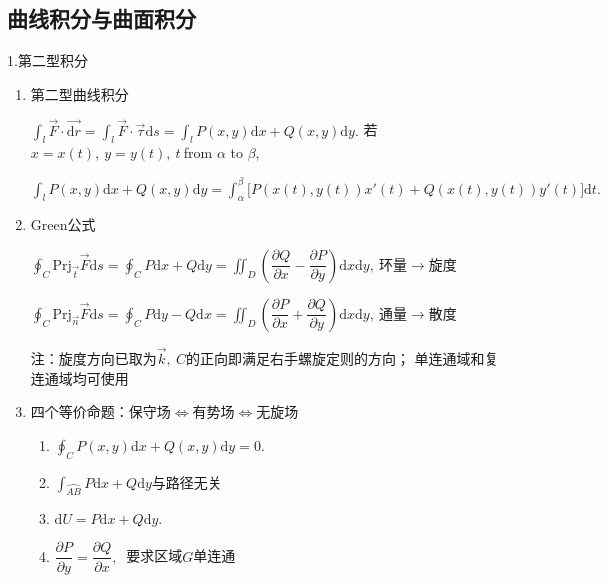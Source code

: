 \documentclass[UTF8]{ctexart}
\newcommand\dif{\mathrm{d}}
\newcommand\no{\noindent}
\newcommand\dis{\displaystyle}
\newcommand\intd{\dis\int}
\begin{document}
\begin{spacing}{2}
\subsection{曲线积分与曲面积分}

\no1.第二型积分

\begin{enumerate}[itemindent=1.4em, label=(\arabic*)]

\item 第二型曲线积分

$\intd_l\stackrel{\rightarrow}{F}\cdot \stackrel{\longrightarrow}{\dif r}=
\intd_l\stackrel{\rightarrow}{F}\cdot\stackrel{\rightarrow}{\tau}\dif s=
\intd_lP(x,y)\dif x+Q(x,y)\dif y.$
若$x=x(t),\ y=y(t),\ t \ $from $\alpha$ to $\beta$, 

$\intd_lP(x,y)\dif x+Q(x,y)\dif y
=\intd_\alpha^\beta\big[P(x(t),y(t))x'(t)+Q(x(t),y(t))y'(t)\big]\dif t.$

\item \textcolor[rgb]{1,0,0}{Green公式}

$\dis\oint_C\text{Prj}_{\stackrel{\rightarrow}{t}}\stackrel{\rightarrow}{F}\dif s
=\oint_CP\dif x+Q\dif y=
\iint_D\left(\dfrac{\partial Q}{\partial x}-\dfrac{\partial P}{\partial y}\right)\dif x\dif y,
\ $环量$\longrightarrow$旋度

$\dis\oint_C\text{Prj}_{\stackrel{\rightarrow}{n}}\stackrel{\rightarrow}{F}\dif s
=\oint_CP\dif y-Q\dif x=
\iint_D\left(\dfrac{\partial P}{\partial x}+\dfrac{\partial Q}{\partial y}\right)\dif x\dif y,
\ $通量$\longrightarrow$散度

注：旋度方向已取为$\stackrel{\rightarrow}{k},\ C$的正向即满足右手螺旋定则的方向；
单连通域和复连通域均可使用

\item 四个等价命题：保守场$\Longleftrightarrow$有势场$\Longleftrightarrow$无旋场

\begin{enumerate}[itemindent=1.4em, label=(\alph*)]

\item $\dis\oint_CP(x,y)\dif x+Q(x,y)\dif y=0.$

\item $\intd_{\wideparen{AB}}P\dif x+Q\dif y$与路径无关

\item $\dif U=P\dif x+Q\dif y.$

\item $\dfrac{\partial P}{\partial y}=\dfrac{\partial Q}{\partial x},\ $
要求区域$G$单连通


\end{enumerate}
\end{enumerate}
\end{spacing}
\end{document}

